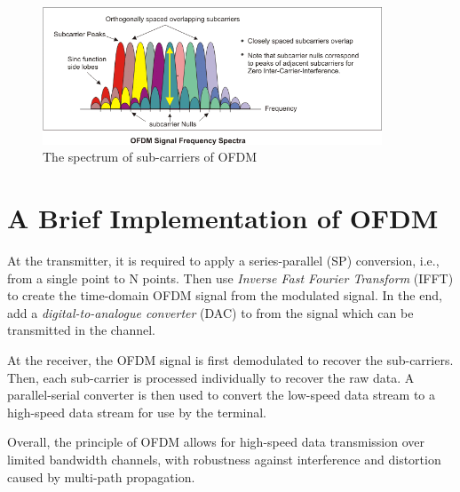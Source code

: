 \documentclass{article}
\numberwithin{figure}{section}
\begin{document}
\begin{figure}[!ht]
    \centering
    \includegraphics[width=0.9\textwidth]{images/subcarriers.png}
    \caption{\label{fig:subcarriers}The spectrum of sub-carriers of OFDM}
\end{figure}

\section{A Brief Implementation of OFDM}
At the transmitter, it is required to apply a series-parallel (SP) conversion, i.e., from a single point to N points. Then use \textit{Inverse Fast Fourier Transform} (IFFT) to create the time-domain OFDM signal from the modulated signal. In the end, add a \textit{digital-to-analogue converter} (DAC) to from the signal which can be transmitted in the channel.

At the receiver, the OFDM signal is first demodulated to recover the sub-carriers. Then, each sub-carrier is processed individually to recover the raw data. A parallel-serial converter is then used to convert the low-speed data stream to a high-speed data stream for use by the terminal.

Overall, the principle of OFDM allows for high-speed data transmission over limited bandwidth channels, with robustness against interference and distortion caused by multi-path propagation. 
\end{document}
